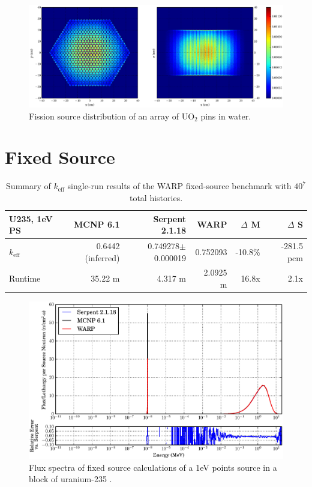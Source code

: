\begin{figure}[h!]
\centering
\includegraphics[width=\textwidth,trim= 2cm 0cm 2cm 0cm]{graphics/finalresults/assembly_fiss-6.eps}
\caption{Fission source distribution of an array of UO$_2$ pins in water. \label{assembly_fiss} }
\end{figure}


\section{Fixed Source}

\begin{table}[h]
\centering
\caption{Summary of $k_\mathrm{eff}$ single-run results of the WARP fixed-source benchmark with $40^7$ total histories.}
\label{fixed_summary}
\begin{tabular}{| l | r | r | r | r | r |}
 \hline
  U235, 1eV PS & MCNP 6.1 & Serpent 2.1.18 & WARP & $\Delta$ M & $\Delta$ S  \\
\hline
\hline
 $k_\mathrm{eff}$ & 0.6442 (inferred) & 0.749278$\pm$0.000019 & 0.752093 & -10.8\%  & -281.5 pcm   \\
 \hline
 Runtime               & 35.22 m & 4.317 m &  2.0925 m & 16.8x  & 2.1x  \\
 \hline
\end{tabular}
\end{table}

\begin{figure}[h!]
\centering
\includegraphics[width=\textwidth]{graphics/finalresults/fixed_spec.eps}
\caption{Flux spectra of fixed source calculations of a 1eV points source in a block of uranium-235 . \label{fixed_spec} }
\end{figure}

